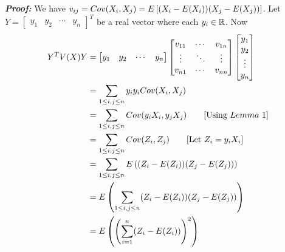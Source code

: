 \documentclass[a4paper, 11pt]{article}
\begin{document}
{	\textbf{\textit{Proof: }}We have $v_{ij}=Cov(X_i,X_j)=E\left[(X_i-E(X_i))(X_j-E(X_j))\right]$. Let $Y=\begin{bmatrix}y_1 & y_2 & \cdots & y_n\end{bmatrix}^T$ be a real vector where each $y_i\in \mathbb{R}$. Now\begin{align*}Y^TV(X)Y & = \begin{bmatrix}y_1 & y_2 & \cdots & y_n\end{bmatrix}\begin{bmatrix}v_{11} & \cdots & v_{1n}\\	\vdots & \ddots & \vdots\\	v_{n1} & \cdots & v_{nn}\end{bmatrix}\begin{bmatrix}y_1\\ y_2 \\ \vdots \\y_n\end{bmatrix} \\
                       & =\sum_{1\leq i,j\leq n} y_iy_iCov(X_i,X_j)                                                                                                                                                                                                      \\
                       & =\sum_{1\leq i,j\leq n}Cov(y_iX_i,y_jX_j)\qquad [\text{Using }Lemma\ 1]                                                                                                                                                                         \\
                       & =\sum_{1\leq i,j\leq n}Cov(Z_i,Z_j)\qquad [\text{Let }Z_i=y_iX_i]                                                                                                                                                                               \\
                       & =\sum_{1\leq i,j\leq n}E\lt((Z_i-E(Z_i))(Z_j-E(Z_j))\rt)                                                                                                                                                                                        \\
                       & =E\lt(\sum_{1\leq i,j\leq n}(Z_i-E(Z_i))(Z_j-E(Z_j))\rt)                                                                                                                                                                                        \\
                       & = E\lt(\lt(\sum_{i=1}^n(Z_i-E(Z_i))\rt)^2\rt)                                                                                                                                                                                                   \\

\end{align*}}
\end{document}
